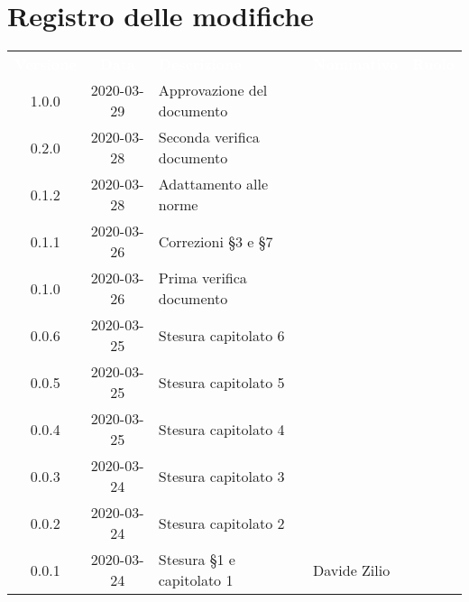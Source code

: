 
\section*{Registro delle modifiche}
{
	\centering
	\begin{longtable}{ c c  C{4cm}  C{3cm}  C{3.5cm} }
		\textcolor{white}{\textbf{Versione}} & \textcolor{white}{\textbf{Data}} & \textcolor{white}{\textbf{Descrizione}} & \textcolor{white}{\textbf{Nominativo}} & \textcolor{white}{\textbf{Ruolo}}\\
		1.0.0 & 2020-03-29 & Approvazione del documento & &\RdP{}\\
		0.2.0 & 2020-03-28 & Seconda verifica documento &  &\ver{}\\	
		0.1.2 & 2020-03-28 & Adattamento alle norme &  &\ana{}\\
		0.1.1 & 2020-03-26 & Correzioni \S 3 e \S 7 &  &\ana{}\\	
		0.1.0 & 2020-03-26 & Prima verifica documento &  &\ver{}\\	
		0.0.6 & 2020-03-25 & Stesura capitolato 6 &  &\ana{}\\	
		0.0.5 & 2020-03-25 & Stesura capitolato 5 &  &\ana{}\\	
		0.0.4 & 2020-03-25 & Stesura capitolato 4 &  &\ana{}\\	
		0.0.3 & 2020-03-24 & Stesura capitolato 3 &  &\ana{}\\	
		0.0.2 & 2020-03-24 & Stesura capitolato 2 &  &\ana{}\\	
		0.0.1 & 2020-03-24 & Stesura \S 1 e capitolato 1 & Davide Zilio &\ana{}\\		
		
	\end{longtable}

}
